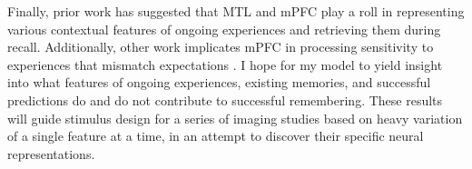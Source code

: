 \documentclass{article}
\begin{document}
Finally, prior work \citep[e.g.,][]{PolyEtal09,MannEtal11} has suggested that MTL and mPFC play a roll in representing various contextual features of ongoing experiences and retrieving them during recall. Additionally, other work implicates mPFC in processing sensitivity to experiences that mismatch expectations \citep[e.g.,][]{RichEtal14}.  I hope for my model to yield insight into what features of ongoing experiences, existing memories, and successful predictions do and do not contribute to successful remembering.  These results will guide stimulus design for a series of imaging studies based on heavy variation of a single feature at a time, in an attempt to discover their specific neural representations.



\pagebreak


\end{document}
